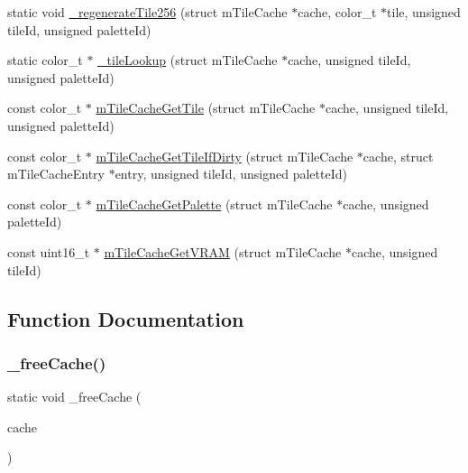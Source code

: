 \begin{DoxyCompactItemize}
static void \mbox{\hyperlink{tile-cache_8c_aa8513c1bab92e82135f641819efb62ef}{\+\_\+regenerate\+Tile256}} (struct m\+Tile\+Cache $\ast$cache, color\+\_\+t $\ast$tile, unsigned tile\+Id, unsigned palette\+Id)
\item 
static color\+\_\+t $\ast$ \mbox{\hyperlink{tile-cache_8c_a643519288c92eb6c00a5f6694984f6d0}{\+\_\+tile\+Lookup}} (struct m\+Tile\+Cache $\ast$cache, unsigned tile\+Id, unsigned palette\+Id)
\item 
const color\+\_\+t $\ast$ \mbox{\hyperlink{tile-cache_8c_a095b4a1a63027962105a30a6197db22d}{m\+Tile\+Cache\+Get\+Tile}} (struct m\+Tile\+Cache $\ast$cache, unsigned tile\+Id, unsigned palette\+Id)
\item 
const color\+\_\+t $\ast$ \mbox{\hyperlink{tile-cache_8c_ac03a3bf273a14e0a825221dce2343a9d}{m\+Tile\+Cache\+Get\+Tile\+If\+Dirty}} (struct m\+Tile\+Cache $\ast$cache, struct m\+Tile\+Cache\+Entry $\ast$entry, unsigned tile\+Id, unsigned palette\+Id)
\item 
const color\+\_\+t $\ast$ \mbox{\hyperlink{tile-cache_8c_a1d3812aa56af3faee81d8fd4b9d76213}{m\+Tile\+Cache\+Get\+Palette}} (struct m\+Tile\+Cache $\ast$cache, unsigned palette\+Id)
\item 
const uint16\+\_\+t $\ast$ \mbox{\hyperlink{tile-cache_8c_a5bf34d1c79ff5b95ad75b72e5082856d}{m\+Tile\+Cache\+Get\+V\+R\+AM}} (struct m\+Tile\+Cache $\ast$cache, unsigned tile\+Id)
\end{DoxyCompactItemize}


\subsection{Function Documentation}
\mbox{\label{tile-cache_8c_a4f35746d84b7aef07507094ca898748f}} 
\subsubsection{\texorpdfstring{\+\_\+free\+Cache()}{\_freeCache()}}
{\footnotesize\ttfamily static void \+\_\+free\+Cache (\begin{DoxyParamCaption}\item[{struct m\+Tile\+Cache $\ast$}]{cache }\end{DoxyParamCaption})\hspace{0.3cm}{\ttfamily [static]}}

